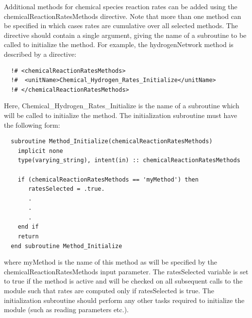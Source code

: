 Additional methods for chemical species reaction rates can be added using the {\normalfont \ttfamily chemicalReactionRatesMethods} directive. Note that more than one method can be specified in which cases rates are cumulative over all selected methods. The directive should contain a single argument, giving the name of a subroutine to be called to initialize the method. For example, the {\normalfont \ttfamily hydrogenNetwork} method is described by a directive:
\begin{verbatim}
  !# <chemicalReactionRatesMethods>
  !#  <unitName>Chemical_Hydrogen_Rates_Initialize</unitName>
  !# </chemicalReactionRatesMethods>
\end{verbatim}
Here, {\normalfont \ttfamily Chemical\_Hydrogen\_Rates\_Initialize} is the name of a subroutine which will be called to initialize the method. The initialization subroutine must have the following form:
\begin{verbatim}
  subroutine Method_Initialize(chemicalReactionRatesMethods)
    implicit none
    type(varying_string), intent(in) :: chemicalReactionRatesMethods
    
    if (chemicalReactionRatesMethods == 'myMethod') then
       ratesSelected = .true.
       .
       .
       .
    end if
    return
  end subroutine Method_Initialize
\end{verbatim}
where {\normalfont \ttfamily myMethod} is the name of this method as will be specified by the {\normalfont \ttfamily chemicalReactionRatesMethods} input parameter. The {\normalfont \ttfamily ratesSelected} variable is set to true if the method is active and will be checked on all subsequent calls to the module such that rates are computed only if {\normalfont \ttfamily ratesSelected} is true. The initialization subroutine should perform any other tasks required to initialize the module (such as reading parameters etc.).

